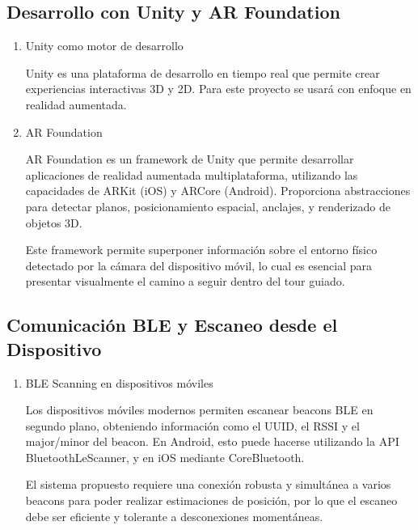 \documentclass{article}
\begin{document}
\subsection{Desarrollo con Unity y AR Foundation}
\begin{enumerate}[label=\thesubsection.\arabic*]
    \item Unity como motor de desarrollo
    
    Unity es una plataforma de desarrollo en tiempo real que permite crear experiencias interactivas 3D y 2D. Para este proyecto se usará con enfoque en realidad aumentada.

    \item AR Foundation
    
    AR Foundation es un framework de Unity que permite desarrollar aplicaciones de realidad aumentada multiplataforma, utilizando las capacidades de ARKit (iOS) y ARCore (Android). Proporciona abstracciones para detectar planos, posicionamiento espacial, anclajes, y renderizado de objetos 3D.

    Este framework permite superponer información sobre el entorno físico detectado por la cámara del dispositivo móvil, lo cual es esencial para presentar visualmente el camino a seguir dentro del tour guiado.

\end{enumerate}

\subsection{Comunicación BLE y Escaneo desde el Dispositivo}
\begin{enumerate}[label=\thesubsection.\arabic*]
    \item BLE Scanning en dispositivos móviles
    
    Los dispositivos móviles modernos permiten escanear beacons BLE en segundo plano, obteniendo información como el UUID, el RSSI y el major/minor del beacon.
    En Android, esto puede hacerse utilizando la API BluetoothLeScanner, y en iOS mediante CoreBluetooth.

    El sistema propuesto requiere una conexión robusta y simultánea a varios beacons para poder realizar estimaciones de posición, por lo que el escaneo debe ser eficiente y tolerante a desconexiones momentáneas.
\end{enumerate}
\end{document}
